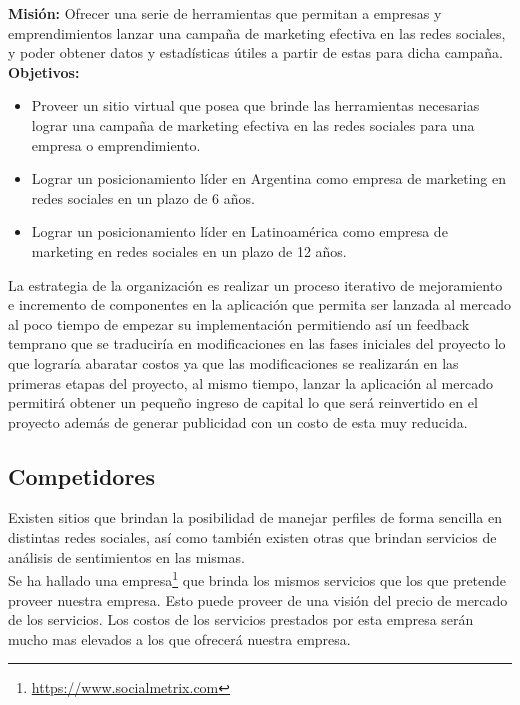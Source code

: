 \documentclass[oneside]{book}
\begin{document}
	\textbf{Misión:} Ofrecer una serie de herramientas que permitan a empresas y emprendimientos lanzar una campa\~{n}a de marketing efectiva en las redes sociales, y poder obtener datos y estad\'{i}sticas \'{u}tiles a partir de estas para dicha campa\~{n}a.\\

	\textbf{Objetivos:}

	\begin{itemize}
		\item Proveer un sitio virtual que posea que brinde las herramientas necesarias lograr una campaña de marketing efectiva en las redes sociales para una empresa o emprendimiento.
		
		\item Lograr un posicionamiento l\'{i}der en Argentina como empresa de marketing en redes sociales en un plazo de 6 a\~{n}os.
		
		\item Lograr un posicionamiento l\'{i}der en Latinoam\'{e}rica como empresa de marketing en redes sociales en un plazo de 12 a\~{n}os.
	\end{itemize}

	La estrategia de la organizaci\'{o}n es realizar un proceso iterativo de mejoramiento e incremento de componentes en la aplicaci\'{o}n que permita ser lanzada al mercado al poco tiempo de empezar su implementaci\'{o}n permitiendo así un feedback temprano que se traducir\'{i}a en modificaciones en las fases iniciales del proyecto lo que lograr\'{i}a abaratar costos ya que las modificaciones se realizar\'{a}n en las primeras etapas del proyecto, al mismo tiempo, lanzar la aplicaci\'{o}n al mercado permitir\'{a} obtener un pequeño ingreso de capital lo que será reinvertido en el proyecto adem\'{a}s de generar publicidad con un costo de esta muy reducida.



\subsection{Competidores}
Existen sitios que brindan la posibilidad de manejar perfiles de forma sencilla en distintas redes sociales, así como también existen otras que brindan servicios de análisis de sentimientos en las mismas.\\ 
Se ha hallado una empresa\footnote{\url{https://www.socialmetrix.com}} que brinda los mismos servicios que los que pretende proveer nuestra empresa. Esto puede proveer de una visi\'{o}n del precio de mercado de los servicios. Los costos de los servicios prestados por esta empresa ser\'{a}n mucho mas elevados a los que ofrecer\'{a} nuestra empresa.
\end{document}
